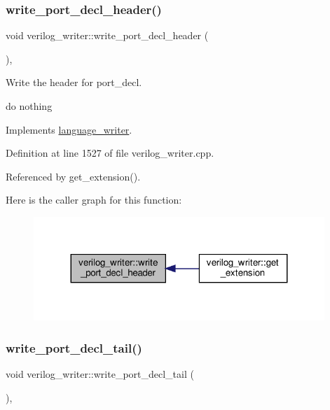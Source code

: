 \subsubsection{\texorpdfstring{write\+\_\+port\+\_\+decl\+\_\+header()}{write\_port\_decl\_header()}}
{\footnotesize\ttfamily void verilog\+\_\+writer\+::write\+\_\+port\+\_\+decl\+\_\+header (\begin{DoxyParamCaption}{ }\end{DoxyParamCaption})\hspace{0.3cm}{\ttfamily [override]}, {\ttfamily [virtual]}}



Write the header for port\+\_\+decl. 

do nothing 

Implements \hyperlink{classlanguage__writer_a89c790a77df81030bd359a1adcaae433}{language\+\_\+writer}.



Definition at line 1527 of file verilog\+\_\+writer.\+cpp.



Referenced by get\+\_\+extension().

Here is the caller graph for this function\+:
\nopagebreak
\begin{figure}[H]
\begin{center}
\leavevmode
\includegraphics[width=311pt]{d8/dba/classverilog__writer_a326f7f3aadac6d88b989a477360feb47_icgraph}
\end{center}
\end{figure}
\mbox{\label{classverilog__writer_adb76a5b50df9958409d5bde95d2dae79}} 
\subsubsection{\texorpdfstring{write\+\_\+port\+\_\+decl\+\_\+tail()}{write\_port\_decl\_tail()}}
{\footnotesize\ttfamily void verilog\+\_\+writer\+::write\+\_\+port\+\_\+decl\+\_\+tail (\begin{DoxyParamCaption}{ }\end{DoxyParamCaption})\hspace{0.3cm}{\ttfamily [override]}, {\ttfamily [virtual]}}



